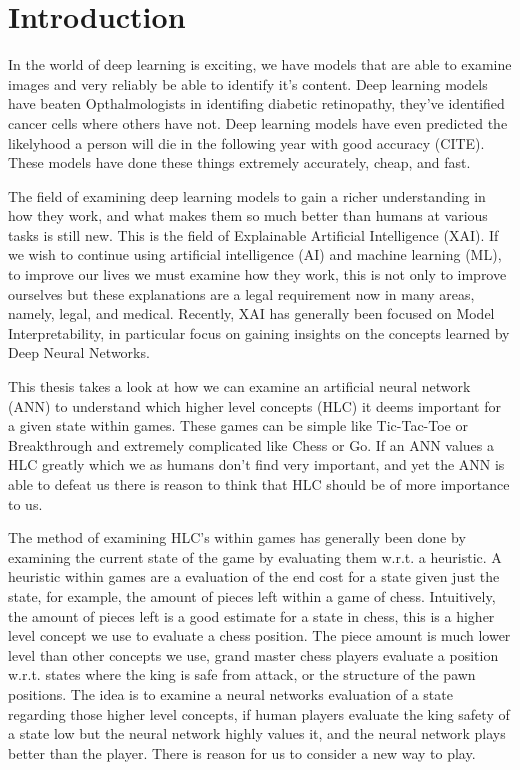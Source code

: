 \chapter{Introduction\label{cha:introduction}}

In the world of deep learning is exciting, we have models that are able to examine
images and very reliably be able to identify it's content. Deep learning models have
beaten Opthalmologists in identifing diabetic retinopathy, they've identified
cancer cells where others have not. Deep learning models have even predicted
the likelyhood a person will die in the following year with good accuracy (CITE).
These models have done these things extremely accurately, cheap, and fast.

The field of examining deep learning models to gain a richer understanding
in how they work, and what makes them so much better than humans at various tasks
is still new. This is the field of Explainable Artificial Intelligence (XAI).
If we wish to continue using artificial intelligence (AI) and machine learning (ML),
to improve our lives we must examine how they work, this is not only to improve
ourselves but these explanations are a legal requirement now in many areas, namely, legal, and
medical. Recently, XAI has generally been focused on Model Interpretability, in
particular focus on gaining insights on the concepts learned by Deep Neural Networks.

This thesis takes a look at how we can examine an artificial neural network (ANN)
to understand which higher level concepts (HLC) it deems important for a given state
within games. These games can be simple like Tic-Tac-Toe or Breakthrough and extremely
complicated like Chess or Go. If an ANN values a HLC greatly which we as humans don't find
very important, and yet the ANN is able to defeat us there is reason to think
that HLC should be of more importance to us.

The method of examining HLC's within games has generally been done by examining the
current state of the game by evaluating them w.r.t. a heuristic. A heuristic within
games are a evaluation of the end cost for a state given just the state, for example,
the amount of pieces left within a game of chess. Intuitively, the amount of pieces
left is a good estimate for a state in chess, this is a higher level concept we
use to evaluate a chess position. The piece amount is much lower level than other
concepts we use, grand master chess players evaluate a position w.r.t. states
where the king is safe from attack, or the structure of the pawn positions.
The idea is to examine a neural networks evaluation of a state regarding
those higher level concepts, if human players evaluate the king safety of a state
low but the neural network highly values it, and the neural network plays better
than the player. There is reason for us to consider a new way to play.


